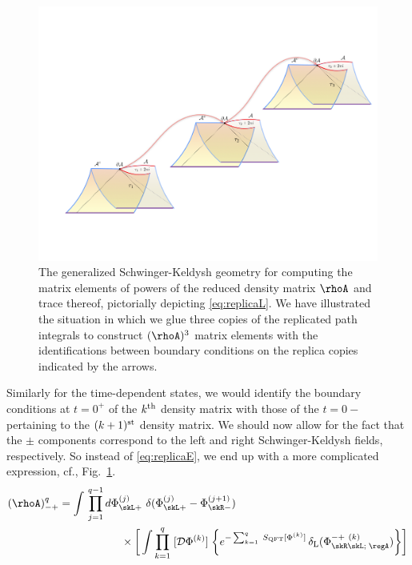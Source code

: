 \documentclass[12pt,openany]{book}
\begin{document}
\begin{figure}[htbp]
\begin{center}
\includegraphics[width=5in]{figures/rho3L}
\caption{ The generalized Schwinger-Keldysh geometry for computing the matrix elements of powers of the  reduced density matrix $\rhoA$ and trace thereof, pictorially depicting \eqref{eq:replicaL}. We have illustrated the situation in which we glue three copies of the replicated path integrals to construct $(\rhoA)^3$ matrix elements with the identifications between boundary conditions on the replica copies indicated by the arrows.}
\label{f:rho3L}
\end{center}
\end{figure}
%
Similarly for the time-dependent states, we would identify the boundary conditions at $t=0^+$ of the $k^{\rm th}$ density matrix with those of the $t=0-$ pertaining to the $(k+1)^{\rm st}$ density matrix. We should now allow for the fact that the $\pm$ components correspond to the left and right Schwinger-Keldysh fields, respectively. So instead of
\eqref{eq:replicaE}, we end up with a more complicated expression, cf., Fig.~\ref{f:rho3L}.
%
\begin{align}
(\rhoA)^q_{-+} &= \int\, \prod_{j=1}^{q-1} d\Phi_{\skL+}^{(j)} \   \delta(\Phi^{(j)}_{\skL+} - \Phi^{(j+1)}_{\skR-})
\nonumber \\
& \hspace{2cm}
  \times \bigg[ \int \prod_{k=1}^q \; [{\cal D} \Phi^{(k)}] \;  \bigg\{ e^{-\sum_{k=1}^q \;
  S_\text{QFT}[\Phi^{(k)}]} \,  \delta_\text{L}(\Phi^{-+ \ (k)}_{\skR\skL;\;  \regA})  \bigg\}
\bigg]
\label{eq:replicaL}
\end{align}
%
\end{document}
